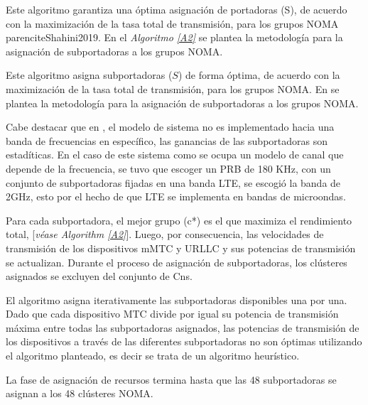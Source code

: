 Este algoritmo garantiza una óptima asignación de portadoras (S), de acuerdo con la maximización de la tasa total de transmisión, para los grupos NOMA parencite{Shahini2019}. En el \textit{Algoritmo \ref{A2}} se plantea la metodología para la asignación de subportadoras a los grupos NOMA. \newline

Este algoritmo asigna subportadoras ($S$) de forma óptima, de acuerdo con la maximización de la tasa total de transmisión, para los grupos NOMA. En \parencite{Shahini2019} se plantea la metodología para la asignación de subportadoras a los grupos NOMA. \newline

Cabe destacar que en \parencite{Shahini2019}, el modelo de sistema no es implementado hacia una banda de frecuencias en específico, las ganancias de las subportadoras son estadíticas. En el caso de este sistema como se ocupa un modelo de canal que depende de la frecuencia, se tuvo que escoger un PRB de 180 KHz, con un conjunto de subportadoras fijadas en una banda LTE, se escogió la banda de 2GHz, esto por el hecho de que LTE se implementa en bandas de microondas. \newline

Para cada subportadora, el mejor grupo (c*) es el que maximiza el rendimiento total, [\textit{véase Algorithm \ref{A2}}]. Luego, por consecuencia, las velocidades de transmisión de los dispositivos mMTC y URLLC y sus potencias de transmisión se actualizan. Durante el proceso de asignación de subportadoras, los clústeres asignados se excluyen del conjunto de Cns. \newline

El algoritmo asigna iterativamente las subportadoras disponibles una por una. Dado que cada dispositivo MTC divide por igual su potencia de transmisión máxima entre todas las subportadoras asignados, las potencias de transmisión de los dispositivos a través de las diferentes subportadoras no son óptimas utilizando el algoritmo planteado, es decir se trata de un algoritmo heurístico. \newline

La fase de asignación de recursos termina hasta que las 48 subportadoras se asignan a los 48 clústeres NOMA. \newline



